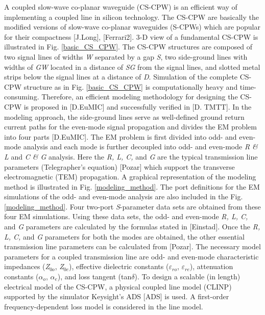 \documentclass[journal]{IEEEtran}
\begin{document}
A coupled slow-wave co-planar waveguide (CS-CPW) is an efficient way of implementing a coupled line in silicon technology. The CS-CPW are basically the modified versions of slow-wave co-planar waveguides (S-CPWs) which are popular for their compactness [J.Long], [Ferrari2]. 3-D view of a fundamental CS-CPW is illustrated in Fig. \ref{basic_CS_CPW}. The CS-CPW structures are composed of two signal lines of widths \textit{W} separated by a gap \textit{S}, two side-ground lines with widths of \textit{GW} located in a distance of \textit{SG} from the signal lines, and slotted metal strips below the signal lines at a distance of \textit{D}. Simulation of the complete CS-CPW structure as in Fig. \ref{basic_CS_CPW} is computationally heavy and time-consuming. Therefore, an efficient modeling methodology for designing the CS-CPW is proposed in [D.EuMIC] and successfully verified in [D. TMTT]. In the modeling approach, the side-ground lines serve as well-defined ground return current paths for the even-mode signal propagation and divides the EM problem into four parts [D.EuMIC]. 
The EM problem is first divided into odd- and even-mode analysis and each mode is further decoupled into odd- and even-mode \textit{R \& L} and \textit{C \& G} analysis. Here the \textit{R, L, C,} and \textit{G} are the typical transmission line parameters (Telegrapher’s equation) [Pozar] which support the transverse electromagnetic (TEM) propagation. A graphical representation of the modeling method is illustrated in Fig. \ref{modeling_method}. The port definitions for the EM simulations of the odd- and even-mode analysis are also included in the Fig. \ref{modeling_method}. Four two-port \textit{S}-parameter data sets are obtained from these four EM simulations. Using these data sets, the odd- and even-mode \textit{R, L, C,} and \textit{G} parameters are calculated by the formulas stated in [Einstad]. Once the \textit{R, L, C,} and \textit{G} parameters for both the modes are obtained, the other essential transmission line parameters can be calculated from [Pozar]. The necessary model parameters for a coupled transmission line are odd- and even-mode characteristic impedances (\textit{Z$_{0o}$}, \textit{Z$_{0e}$}), effective dielectric constants ($\varepsilon$$_{ro}$, $\varepsilon$$_{re}$), attenuation constants ($\alpha$$_o$, $\alpha$$_e$), and loss tangent (tan$\delta$). To design a scalable (in length) electrical model of the CS-CPW, a physical coupled line model (CLINP) supported by the simulator Keysight's ADS [ADS] is used. A first-order frequency-dependent loss model is considered in the line model. 
\end{document}

